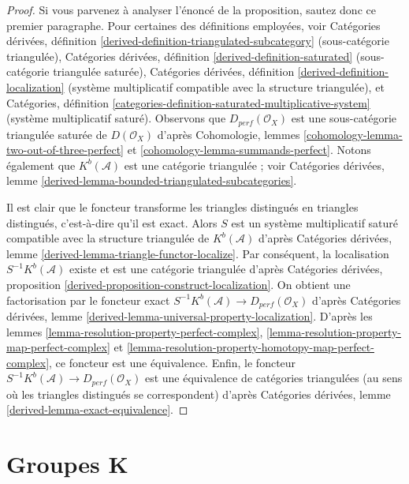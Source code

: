 \begin{proof}
Si vous parvenez à analyser l'énoncé de la proposition, sautez donc ce
premier paragraphe. Pour certaines des définitions employées, voir
Catégories dérivées, définition
\ref{derived-definition-triangulated-subcategory}
(sous-catégorie triangulée),
Catégories dérivées, définition \ref{derived-definition-saturated}
(sous-catégorie triangulée saturée),
Catégories dérivées, définition \ref{derived-definition-localization}
(système multiplicatif compatible avec la structure triangulée), et
Catégories,
définition \ref{categories-definition-saturated-multiplicative-system}
(système multiplicatif saturé).
Observons que $D_{perf}(\mathcal{O}_X)$ est une sous-catégorie triangulée saturée
de $D(\mathcal{O}_X)$ d'après
Cohomologie, lemmes \ref{cohomology-lemma-two-out-of-three-perfect} et
\ref{cohomology-lemma-summands-perfect}. Notons également que
$K^b(\mathcal{A})$ est une catégorie triangulée ; voir
Catégories dérivées, lemme
\ref{derived-lemma-bounded-triangulated-subcategories}.

\medskip\noindent
Il est clair que le foncteur transforme les triangles distingués en
triangles distingués, c'est-à-dire qu'il est exact. Alors $S$ est un système
multiplicatif saturé compatible avec la structure triangulée
de $K^b(\mathcal{A})$ d'après
Catégories dérivées, lemme \ref{derived-lemma-triangle-functor-localize}.
Par conséquent, la localisation $S^{-1}K^b(\mathcal{A})$ existe et est
une catégorie triangulée d'après
Catégories dérivées, proposition
\ref{derived-proposition-construct-localization}.
On obtient une factorisation par le foncteur exact
$S^{-1}K^b(\mathcal{A}) \to D_{perf}(\mathcal{O}_X)$ d'après
Catégories dérivées, lemme
\ref{derived-lemma-universal-property-localization}.
D'après les lemmes \ref{lemma-resolution-property-perfect-complex},
\ref{lemma-resolution-property-map-perfect-complex} et
\ref{lemma-resolution-property-homotopy-map-perfect-complex},
ce foncteur est une équivalence. Enfin, le foncteur
$S^{-1}K^b(\mathcal{A}) \to D_{perf}(\mathcal{O}_X)$
est une équivalence de catégories triangulées (au sens où
les triangles distingués se correspondent) d'après
Catégories dérivées, lemme \ref{derived-lemma-exact-equivalence}.
\end{proof}



\section{Groupes K}
\label{section-K-groups}

